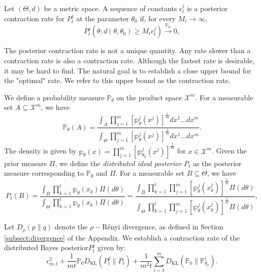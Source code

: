 \documentclass[twoside,11pt]{article}
\numberwithin{equation}{section}
\newcommand\bP{\mathbb{P}}
\newcommand\bp{\mathbb{p}}
\newcommand{\X}{\mathcal{X}}
\newcommand{\pto}{\stackrel{\bP_0}{\to}}
\begin{document}
{Let $(\Theta, d)$ be a metric space. A sequence of constants $\epsilon_t^j$ is a posterior contraction rate for $P_t^j$ at the parameter $\theta_0$ if, for every $M_t \to \infty$, 
\begin{equation} \label{def:contraction-rate}
    P_t^j\left(\theta: d(\theta, \theta_0) \geq M_t \epsilon_t^j \right) \pto 0, 
\end{equation}

The posterior contraction rate is not a unique quantity. Any rate slower than a contraction rate is also a contraction rate. Although the fastest rate is desirable, it may be hard to find. The natural goal is to establish a close upper bound for the "optimal" rate. We refer to this upper bound as the contraction rate. 

We define a probability measure $\bP_\theta$ on the product space $\X^m$. For a measurable set $A \subseteq \X^m$, we have
\begin{equation*}
    \bP_\theta(A) = \frac{\int_A  \prod_{j = 1}^m [\bp_{\theta}^j(x^j)]^{\frac{1}{m}} dx^1 \ldots d x^m}{\int_\Theta  \prod_{j = 1}^m [\bp_{\theta}^j(x^j)]^{\frac{1}{m}} dx^1 \ldots d x^m}. 
\end{equation*}
The density is given by $\bp_\theta(x) = \prod_{j = 1}^m [\bp_{\theta_0}^j(x^j)]^{\frac{1}{m}}$ for $x \in \X^m$. Given the prior measure $\Pi$,  we define the \textit{distributed ideal posterior} $P_t$ as the posterior measure corresponding to $\bP_\theta$ and $\Pi$. For a measurable set $B \subseteq \Theta$, we have 
\begin{equation} \label{def-ideal-posterior}
    P_t(B) =\frac{\int_B \prod_{k = 1}^t \bp_\theta(x_k) \Pi(d\theta)}{\int_\Theta \prod_{k = 1}^t \bp_\theta(x_k) \Pi(d\theta)} = \frac{\int_B \prod_{k = 1}^t \prod_{j = 1}^m [\bp_\theta^j(x_k^j)]^{\frac{1}{m}}\Pi(d\theta)}{\int_\Theta \prod_{k = 1}^t \prod_{j = 1}^m [\bp_\theta^j(x_k^j)]^{\frac{1}{m}}\Pi(d\theta)}, 
\end{equation}

Let $D_{\rho}(p \parallel q)$ denote the $\rho-$Rényi divergence, as defined in Section \eqref{subsect:divergence} of the Appendix. 
We establish a contraction rate of the distributed Bayes posterior$P_t^j$ given by:
\begin{equation} \label{eqn:contraction-rate}
    \epsilon_{m,t}^2 + \frac{1}{mt} \bP_0 D_{\text{KL}}(P_t^j \parallel P_t) + \frac{1}{m^2 t} \sum_{i = 1}^m D_{\text{KL}}(\bP_0 \parallel \bP_{\theta_0}^i).
\end{equation}

}
\end{document}
